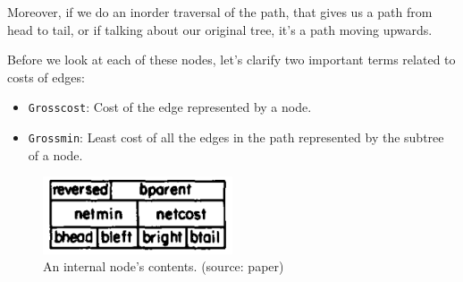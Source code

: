 \documentclass[a4paper, 11pt]{article}
\begin{document}
Moreover, if we do an inorder traversal of the path, that gives us a path from head to tail, or if talking about our original tree, it’s a path moving upwards.

Before we look at each of these nodes, let’s clarify two important terms related to costs of edges:

\begin{itemize}
    \item \texttt{Grosscost}: Cost of the edge represented by a node.
    \item \texttt{Grossmin}: Least cost of all the edges in the path represented by the subtree of a node.
\end{itemize}

\begin{figure}
    \centering
    \includegraphics[width=0.5\textwidth]{img/diagrams/internal_node.png}
    \caption{An internal node's contents.  (source: paper)}
    \label{fig:5}
\end{figure}
\end{document}
